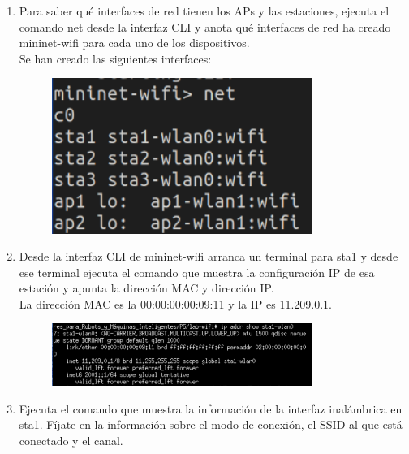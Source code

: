 \documentclass[12pt, a4paper]{report}
\begin{document}
\begin{enumerate}
	\item Para saber qué interfaces de red tienen los APs y las estaciones, ejecuta el comando net desde la interfaz CLI y anota qué interfaces de red ha creado mininet-wifi para cada uno de los
	dispositivos.\\
	
	Se han creado las siguientes interfaces:
	\begin{figure}[h]
		\centering
		\includegraphics[width=0.8\textwidth]{ej1.1}
	\end{figure}
	\item Desde la interfaz CLI de mininet-wifi arranca un terminal para sta1 y desde ese terminal ejecuta
	el comando que muestra la configuración IP de esa estación y apunta la dirección MAC y dirección
	IP.\\
	
	La dirección MAC es la 00:00:00:00:09:11 y la IP es 11.209.0.1.
	\begin{figure}[h]
		\centering
		\includegraphics[width=0.8\textwidth]{ej1.2}
	\end{figure}
	\item Ejecuta el comando que muestra la información de la interfaz inalámbrica en sta1. Fíjate en la
	información sobre el modo de conexión, el SSID al que está conectado y el canal.\\
	

\end{enumerate}
\end{document}
